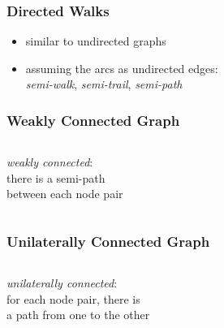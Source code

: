 \documentclass[dvipsnames]{beamer}
\begin{document}
\begin{frame}
  \frametitle{Directed Walks}

  \begin{itemize}
    \item similar to undirected graphs

    \pause
    \item assuming the arcs as undirected edges:\\
      \emph{semi-walk}, \emph{semi-trail}, \emph{semi-path}
  \end{itemize}
\end{frame}

\begin{frame}
  \frametitle{Weakly Connected Graph}

  \begin{columns}
    \begin{definition}
      \emph{weakly connected}:\\
      there is a semi-path\\
      between each node pair
    \end{definition}

    \begin{example}
      \begin{center}
      \end{center}
    \end{example}
  \end{columns}
\end{frame}

\begin{frame}
  \frametitle{Unilaterally Connected Graph}

  \begin{columns}
    \begin{definition}
      \emph{unilaterally connected}:\\
      for each node pair, there is\\
      a path from one to the other
    \end{definition}

    \begin{example}
      \begin{center}
      \end{center}
    \end{example}
  \end{columns}
\end{frame}
\end{document}
